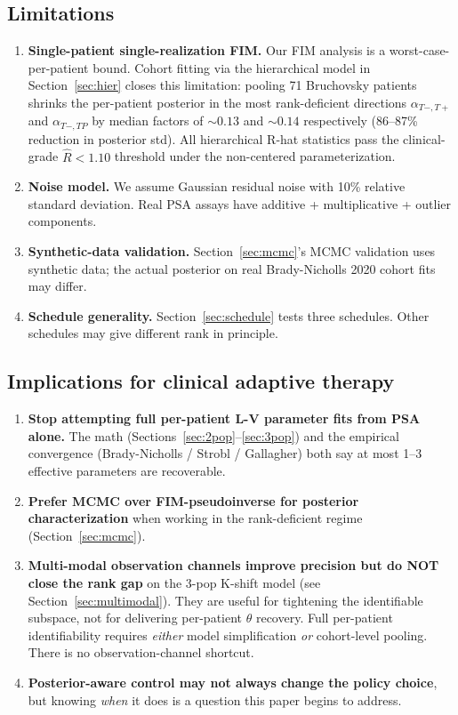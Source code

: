 \documentclass[11pt]{article}
\newcommand{\Tplus}{T{+}}
\newcommand{\Tminus}{T{-}}
\newcommand{\rhat}{\hat{R}}
\begin{document}
\subsection{Limitations}

\begin{enumerate}
\item \textbf{Single-patient single-realization FIM.} Our FIM analysis is a
worst-case-per-patient bound. Cohort fitting via the hierarchical model in
Section~\ref{sec:hier} closes this limitation: pooling 71 Bruchovsky patients
shrinks the per-patient posterior in the most rank-deficient directions
$\alpha_{\Tminus,\Tplus}$ and $\alpha_{\Tminus,TP}$ by median factors of
$\sim 0.13$ and $\sim 0.14$ respectively (86--87\% reduction in posterior std).
All hierarchical R-hat statistics pass the clinical-grade $\rhat < 1.10$
threshold under the non-centered parameterization.
\item \textbf{Noise model.} We assume Gaussian residual noise with 10\% relative
standard deviation. Real PSA assays have additive + multiplicative + outlier
components.
\item \textbf{Synthetic-data validation.} Section~\ref{sec:mcmc}'s MCMC validation
uses synthetic data; the actual posterior on real Brady-Nicholls 2020 cohort
fits may differ.
\item \textbf{Schedule generality.} Section~\ref{sec:schedule} tests three
schedules. Other schedules may give different rank in principle.
\end{enumerate}

\subsection{Implications for clinical adaptive therapy}

\begin{enumerate}
\item \textbf{Stop attempting full per-patient L-V parameter fits from PSA alone.}
The math (Sections~\ref{sec:2pop}--\ref{sec:3pop}) and the empirical convergence
(Brady-Nicholls / Strobl / Gallagher) both say at most 1--3 effective parameters
are recoverable.
\item \textbf{Prefer MCMC over FIM-pseudoinverse for posterior characterization}
when working in the rank-deficient regime (Section~\ref{sec:mcmc}).
\item \textbf{Multi-modal observation channels improve precision but do NOT
close the rank gap} on the 3-pop K-shift model (see Section~\ref{sec:multimodal}).
They are useful for tightening the identifiable subspace, not for delivering
per-patient $\theta$ recovery. Full per-patient identifiability requires
\emph{either} model simplification \emph{or} cohort-level pooling. There is
no observation-channel shortcut.
\item \textbf{Posterior-aware control may not always change the policy choice},
but knowing \emph{when} it does is a question this paper begins to address.
\end{enumerate}
\end{document}
